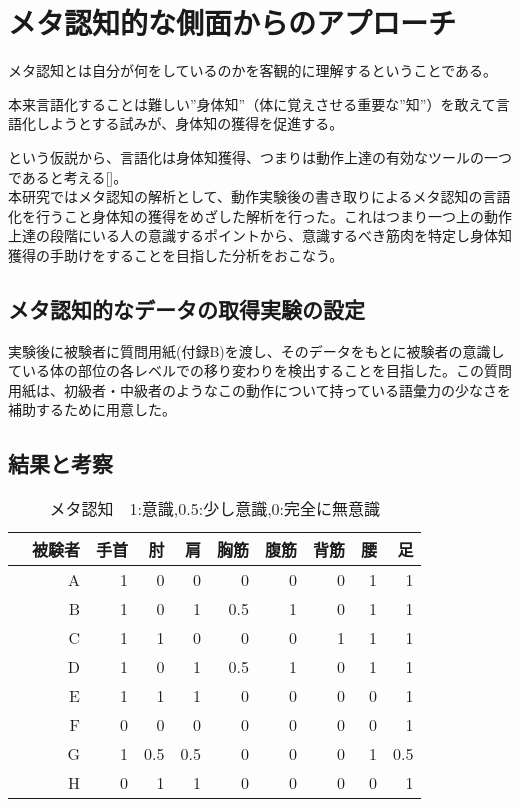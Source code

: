 \documentclass[11pt,a4j,notitlepage]{jreport}
\begin{document}
\chapter{メタ認知的な側面からのアプローチ}
メタ認知とは自分が何をしているのかを客観的に理解するということである。\\
\begin{screen}
本来言語化することは難しい”身体知”（体に覚えさせる重要な”知”）を敢えて言語化しようとする試みが、身体知の獲得を促進する。
\end{screen}
という仮説から、言語化は身体知獲得、つまりは動作上達の有効なツールの一つであると考える[]。
\\
本研究ではメタ認知の解析として、動作実験後の書き取りによるメタ認知の言語化を行うこと身体知の獲得をめざした解析を行った。これはつまり一つ上の動作上達の段階にいる人の意識するポイントから、意識するべき筋肉を特定し身体知獲得の手助けをすることを目指した分析をおこなう。\\

\section{メタ認知的なデータの取得実験の設定}
実験後に被験者に質問用紙(付録B)を渡し、そのデータをもとに被験者の意識している体の部位の各レベルでの移り変わりを検出することを目指した。この質問用紙は、初級者・中級者のようなこの動作について持っている語彙力の少なさを補助するために用意した。

\section{結果と考察}
\begin{table}[htb]
\label{tab:meta}
\begin{tabular}{|r||r|r|r|r|r|r|r|r|}\hline
被験者　&手首&肘&肩&胸筋&腹筋&背筋&腰&足\\ \hline\hline
A&1&0&0&0&0&0&1&1\\ \hline
B&1&0&1&0.5&1&0&1&1\\ \hline
C&1&1&0&0&0&1&1&1\\ \hline
D&1&0&1&0.5&1&0&1&1\\ \hline
E&1&1&1&0&0&0&0&1\\ \hline
F&0&0&0&0&0&0&0&1\\ \hline
G&1&0.5&0.5&0&0&0&1&0.5\\ \hline
H&0&1&1&0&0&0&0&1\\ \hline

\end{tabular}
\caption{メタ認知　1:意識,0.5:少し意識,0:完全に無意識}
\end{table}
\end{document}
